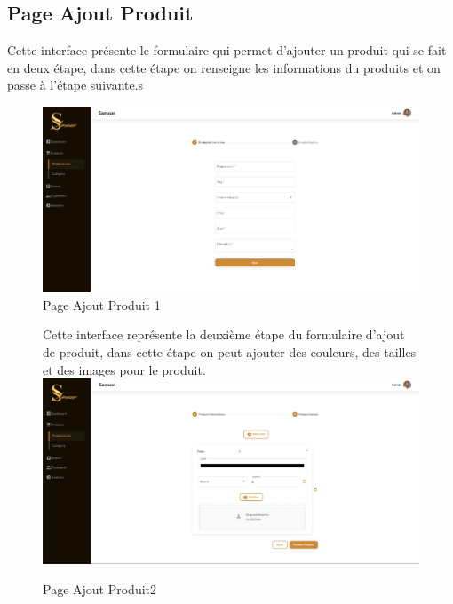 \documentclass[a4paper, 12pt]{report}
\begin{document}
\subsection{Page Ajout Produit}
Cette interface présente le formulaire qui permet d'ajouter un produit qui se fait en deux étape, dans cette étape on renseigne les informations du produits et on passe à l'étape suivante.s
\begin{figure}[H]
    \centering
    \includegraphics[width = 1\linewidth]{img/add.png}
    \caption{Page Ajout Produit 1}
\end{figure}

\begin{figure}[H]
Cette interface représente la deuxième étape du formulaire d'ajout de produit, dans cette étape on peut ajouter des couleurs, des tailles et des images pour le produit. 
    \centering
    \includegraphics[width = 1\linewidth]{img/add2.png}
    \caption{Page Ajout Produit2}
\end{figure}
\end{document}
